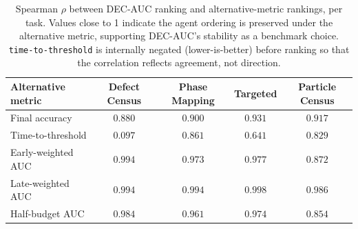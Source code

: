 \begin{table}[h]
\centering
\caption{Spearman $\rho$ between DEC-AUC ranking and alternative-metric rankings, per task. Values close to 1 indicate the agent ordering is preserved under the alternative metric, supporting DEC-AUC's stability as a benchmark choice. \texttt{time-to-threshold} is internally negated (lower-is-better) before ranking so that the correlation reflects agreement, not direction.}
\label{tab:metric_alternatives}
\begin{tabular}{lcccc}
\toprule
\textbf{Alternative metric} & \textbf{Defect Census} & \textbf{Phase Mapping} & \textbf{Targeted} & \textbf{Particle Census} \\
\midrule
Final accuracy & $0.880$ & $0.900$ & $0.931$ & $0.917$ \\
Time-to-threshold & $0.097$ & $0.861$ & $0.641$ & $0.829$ \\
Early-weighted AUC & $0.994$ & $0.973$ & $0.977$ & $0.872$ \\
Late-weighted AUC & $0.994$ & $0.994$ & $0.998$ & $0.986$ \\
Half-budget AUC & $0.984$ & $0.961$ & $0.974$ & $0.854$ \\
\bottomrule
\end{tabular}
\end{table}
